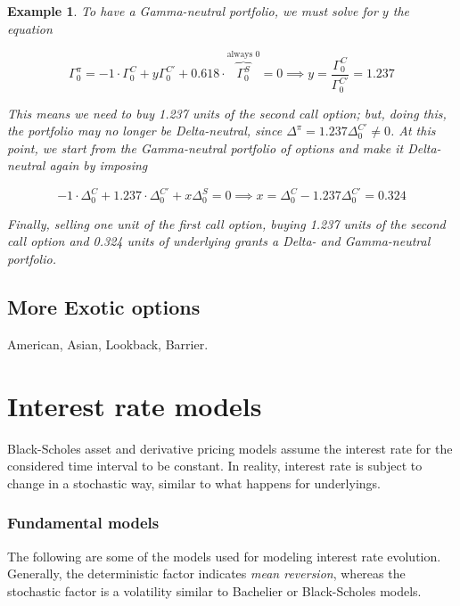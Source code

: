 \documentclass[oneside,titlepage,headinclude,12pt,a4paper,BCOR5mm,footinclude]{book}
\theoremstyle{defn}
\newtheorem{example}{Example}
\begin{document}
\begin{example}
  To have a Gamma-neutral portfolio, we must solve for $y$ the equation

  \[
    \Gamma_0^\pi = -1 \cdot \Gamma_0^C + y\Gamma_0^{C'} + 0.618\cdot \overbrace{\Gamma_0^S}^{\text{always }0} = 0
    \implies y = \frac{\Gamma_0^C}{\Gamma_0^{C'}} = 1.237
  \]

  This means we  need to buy 1.237  units of the second call  option; but, doing
  this,  the portfolio  may  no  longer be  Delta-neutral,  since $\Delta^\pi  =
  1.237\Delta_0^{C'} \neq  0$. At  this point, we  start from  the Gamma-neutral
  portfolio of options and make it Delta-neutral again by imposing

  \[
    -1\cdot\Delta_0^C + 1.237\cdot\Delta_0^{C'} + x\Delta_0^S = 0
    \implies
    x = \Delta_0^C - 1.237\Delta_0^{C'} = 0.324
  \]

  Finally, selling one unit of the first  call option, buying 1.237 units of the
  second  call  option  and  0.324  units of  underlying  grants  a  Delta-  and
  Gamma-neutral portfolio.

\end{example}

\section{More Exotic options}

American, Asian, Lookback, Barrier.

\chapter{Interest rate models}

Black-Scholes asset and  derivative pricing models assume the  interest rate for
the  considered time  interval  to be  constant. In  reality,  interest rate  is
subject to change in a stochastic way, similar to what happens for underlyings.

\subsection{Fundamental models}

The following are some of the  models used for modeling interest rate evolution.
Generally, the  deterministic factor indicates \textit{mean  reversion}, whereas
the  stochastic factor  is a  volatility similar  to Bachelier  or Black-Scholes
models.

\medskip
\end{document}
